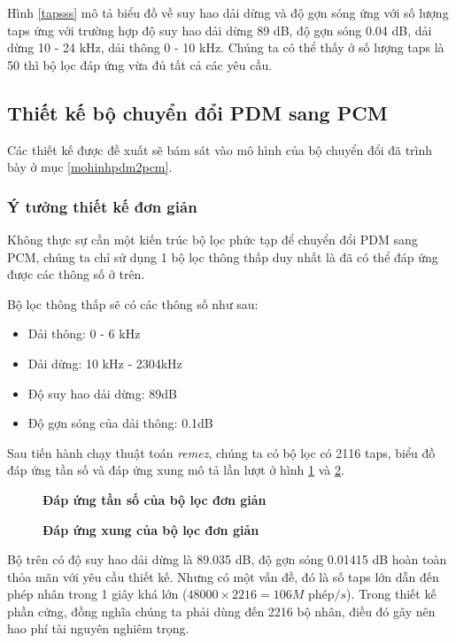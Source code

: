 Hình \ref{tapsss} mô tả biểu đồ về suy hao dải dừng và độ gợn sóng ứng với số lượng taps ứng với trường hợp độ suy hao dải dừng 89 dB, độ gợn sóng 0.04 dB, dải dừng 10 - 24 kHz, dải thông 0 - 10 kHz. Chúng ta có thể thấy ở số lượng taps là 50 thì bộ lọc đáp ứng vừa đủ tất cả các yêu cầu.
\subsection{Thiết kế bộ chuyển đổi  PDM sang PCM}
Các thiết kế được đề xuất sẽ bám sát vào mô hình của bộ chuyển đổi đã trình bày ở mục \ref{mohinhpdm2pcm}.
\subsubsection{Ý tưởng thiết kế đơn giản} \label{dongian}
Không thực sự cần một kiến trúc bộ lọc phức tạp để chuyển đổi PDM sang PCM, chúng ta chỉ sử dụng 1 bộ lọc thông thấp duy nhất là đã có thể đáp ứng được các thông số ở trên.

Bộ lọc thông thấp sẽ có các thông số như sau: 
\begin{itemize}
    \item Dải thông: 0 - 6 kHz
    \item Dải dừng: 10 kHz - 2304kHz
    \item Độ suy hao dải dừng: 89dB
    \item Độ gợn sóng của dải thông: 0.1dB
\end{itemize}

Sau tiến hành chạy thuật toán \textit{remez}, chúng ta có bộ lọc có 2116 taps,  biểu đồ đáp ứng tần số và đáp ứng xung mô tả lần lượt ở hình \ref{filter_the_damn_thing} và \ref{filter_the_damn_thing_impulse}.
\begin{figure}[H]
    \centering
    
    \caption[Đáp ứng tần số của bộ lọc đơn giản]{\bfseries \fontsize{12pt}{0pt}\selectfont Đáp ứng tần số của bộ lọc đơn giản}
    \label{filter_the_damn_thing}
\end{figure}
\begin{figure}[H]
    \centering
    
    \caption[Đáp ứng xung của bộ lọc đơn giản]{\bfseries \fontsize{12pt}{0pt}\selectfont Đáp ứng xung của bộ lọc đơn giản}
    \label{filter_the_damn_thing_impulse}
\end{figure}

Bộ trên có độ suy hao dải dừng là 89.035 dB, độ gợn sóng 0.01415 dB hoàn toàn thỏa mãn với yêu cầu thiết kế. Nhưng có một vấn đề, đó là số taps lớn dẫn đến phép nhân trong 1 giây khá lớn ($48000 \times 2216 = 106M \text{ phép}/s$). Trong thiết kế phần cứng, đồng nghĩa chúng ta phải dùng đến 2216 bộ nhân, điều đó gây nên hao phí tài nguyên nghiêm trọng.


